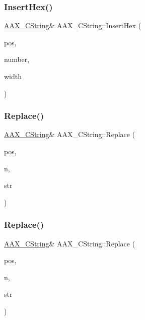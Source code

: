 \mbox{\label{a01573_a997f5d35fe26da01fcd895d642a93c2e}} 
\subsubsection{\texorpdfstring{InsertHex()}{InsertHex()}}
{\footnotesize\ttfamily \mbox{\hyperlink{a01573}{A\+A\+X\+\_\+\+C\+String}}\& A\+A\+X\+\_\+\+C\+String\+::\+Insert\+Hex (\begin{DoxyParamCaption}\item[{uint32\+\_\+t}]{pos,  }\item[{int32\+\_\+t}]{number,  }\item[{int32\+\_\+t}]{width }\end{DoxyParamCaption})}

\mbox{\label{a01573_a5c9ce66b740633bf47505a3129e557c2}} 
\subsubsection{\texorpdfstring{Replace()}{Replace()}\hspace{0.1cm}{\footnotesize\ttfamily [1/2]}}
{\footnotesize\ttfamily \mbox{\hyperlink{a01573}{A\+A\+X\+\_\+\+C\+String}}\& A\+A\+X\+\_\+\+C\+String\+::\+Replace (\begin{DoxyParamCaption}\item[{uint32\+\_\+t}]{pos,  }\item[{uint32\+\_\+t}]{n,  }\item[{const \mbox{\hyperlink{a01573}{A\+A\+X\+\_\+\+C\+String}} \&}]{str }\end{DoxyParamCaption})}

\mbox{\label{a01573_a0042478ce045fd36b91a7cfc1122ffb6}} 
\subsubsection{\texorpdfstring{Replace()}{Replace()}\hspace{0.1cm}{\footnotesize\ttfamily [2/2]}}
{\footnotesize\ttfamily \mbox{\hyperlink{a01573}{A\+A\+X\+\_\+\+C\+String}}\& A\+A\+X\+\_\+\+C\+String\+::\+Replace (\begin{DoxyParamCaption}\item[{uint32\+\_\+t}]{pos,  }\item[{uint32\+\_\+t}]{n,  }\item[{const char $\ast$}]{str }\end{DoxyParamCaption})}

